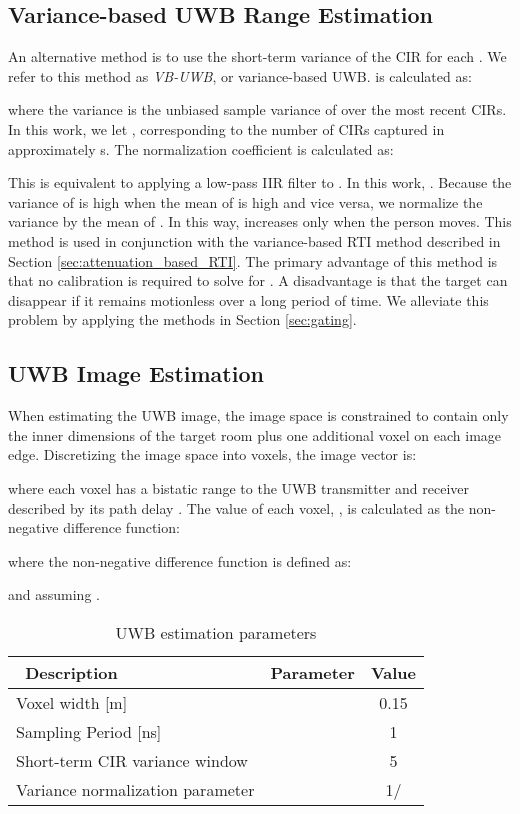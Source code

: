 \documentclass[conference]{IEEEtran}
\begin{document}
\subsection{Variance-based UWB Range Estimation} \label{sec:uwb_variance}
 
An alternative method is to use the short-term variance of the CIR for
each . We refer to this method as \emph{VB-UWB}, or
variance-based UWB.  is calculated as:

where the variance  is the unbiased sample variance of
 over the  most recent CIRs. In this work, we let ,
corresponding to the number of CIRs captured in approximately 
s. The normalization coefficient  is calculated as:

This is equivalent to applying a low-pass IIR filter to . In this
work, . Because the variance of  is high
when the mean of  is high and vice versa, we normalize the
variance  by the mean of . In this way,
 increases only when the person moves. This method is used
in conjunction with the variance-based RTI method described in Section
\ref{sec:attenuation_based_RTI}. The primary advantage of this method
is that no calibration is required to solve for . A
disadvantage is that the target can disappear if it remains motionless
over a long period of time. We alleviate this problem by applying the
methods in Section \ref{sec:gating}.



\subsection{UWB Image Estimation} \label{sec:uwb_image}

When estimating the UWB image, the image space is constrained to
contain only the inner dimensions of the target room plus one
additional voxel on each image edge. Discretizing the image space into
 voxels, the image vector is:

where each voxel  has a bistatic range to the UWB transmitter
and receiver described by its path delay . The value of each
voxel, , is calculated as the non-negative difference function:

where the non-negative difference function is defined as:

and assuming .

\begin{table}[t!]
    \caption{UWB estimation parameters} \centering
        \footnotesize
        \begin{tabular}{l c c} \hline\hline\          Description & Parameter & Value \\
        \hline  Voxel width [m]                    &           & 0.15  \\
        Sampling Period [ns]               &           & 1 \\
        Short-term CIR variance window     &         & 5 \\
        Variance normalization parameter   &       & 1/ \\
        \hline \end{tabular}
        \label{T:UWBImageParameters}
\end{table}
\end{document}

